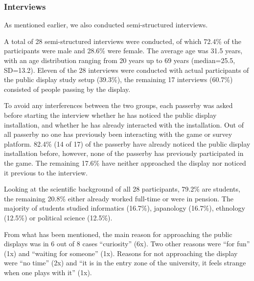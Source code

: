 
	\subsubsection{Interviews}

As mentioned earlier, we also conducted semi-structured interviews.

A total of 28 semi-structured interviews were conducted, of which 72.4\% of the participants were male and 28.6\% were female. The average age was 31.5 years, with an age distribution ranging from 20 years up to 69 years (median=25.5, SD=13.2). Eleven of the 28 interviews were conducted with actual participants of the public display study setup (39.3\%), the remaining 17 interviews (60.7\%) consisted of people passing by the display. 

To avoid any interferences between the two groups, each passerby was asked before starting the interview whether he has noticed the public display installation, and whether he has already interacted with the installation. Out of all passerby no one has previously been interacting with the game or survey platform. 82.4\% (14 of 17) of the passerby have already noticed the public display installation before, however, none of the passerby has previously participated in the game. The remaining 17.6\% have neither approached the display nor noticed it previous to the interview. 

Looking at the scientific background of all 28 participants, 79.2\% are students, the remaining 20.8\% either already worked full-time or were in pension. The majority of students studied informatics (16.7\%), japanology (16.7\%), ethnology (12.5\%) or political science (12.5\%).

From what has been mentioned, the main reason for approaching the public displays was in 6 out of 8 cases ``curiosity'' (6x). Two other reasons were ``for fun'' (1x) and ``waiting for someone'' (1x). Reasons for not approaching the display were ``no time'' (2x) and ``it is in the entry zone of the university, it feels strange when one plays with it'' (1x).




